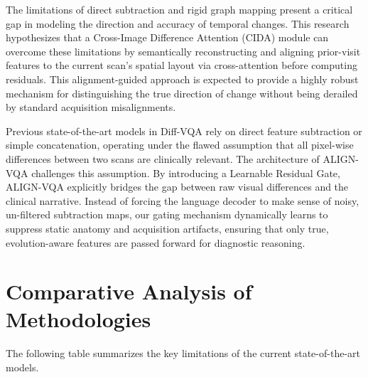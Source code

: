 The limitations of direct subtraction and rigid graph mapping present a critical gap in modeling the direction and accuracy of temporal changes. This research hypothesizes that a Cross-Image Difference Attention (CIDA) module can overcome these limitations by semantically reconstructing and aligning prior-visit features to the current scan's spatial layout via cross-attention before computing residuals. This alignment-guided approach is expected to provide a highly robust mechanism for distinguishing the true direction of change without being derailed by standard acquisition misalignments.

Previous state-of-the-art models in Diff-VQA rely on direct feature subtraction or simple concatenation, operating under the flawed assumption that all pixel-wise differences between two scans are clinically relevant. The architecture of ALIGN-VQA challenges this assumption. By introducing a Learnable Residual Gate, ALIGN-VQA explicitly bridges the gap between raw visual differences and the clinical narrative. Instead of forcing the language decoder to make sense of noisy, un-filtered subtraction maps, our gating mechanism dynamically learns to suppress static anatomy and acquisition artifacts, ensuring that only true, evolution-aware features are passed forward for diagnostic reasoning.




\section{Comparative Analysis of Methodologies}
The following table summarizes the key limitations of the current state-of-the-art models.

